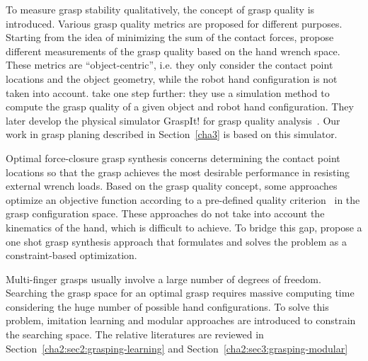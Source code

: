 To measure grasp stability qualitatively, the concept of grasp quality is introduced. Various grasp quality metrics are proposed for different purposes. Starting from the idea of minimizing the sum of the contact forces, \citep{li1988task,kirkpatrick1992quantitative, ferrari1992planning} propose different measurements of the grasp quality based on the hand wrench space.
These metrics are ``object-centric'', i.e. they only consider the contact point locations and the object geometry, while the robot hand configuration is not taken into account. \citet{miller1999examples} take one step further: they use a simulation method to compute the grasp quality of a given object and robot hand configuration. They later develop the physical simulator GraspIt! for grasp quality analysis~\citep{miller2004graspit}. Our work in grasp planing described in Section~\ref{cha3} is based on this simulator.

Optimal force-closure grasp synthesis concerns determining the contact point locations so that the grasp achieves the most desirable performance in resisting external wrench loads.
Based on the grasp quality concept, some approaches optimize an objective function according to a pre-defined quality criterion~\citep{Zhu2003,Zhu04} in the grasp configuration space.
These approaches do not take into account the kinematics of the hand, which is difficult to achieve. To bridge this gap, \citet{S.ElKhoury2012} propose a one shot grasp synthesis approach that formulates and solves the problem as a constraint-based optimization.

Multi-finger grasps usually involve a large number of degrees of freedom.
Searching the grasp space for an optimal grasp requires massive computing time considering the huge number of possible hand configurations. To solve this problem, imitation learning and modular approaches are introduced to constrain the searching space. The relative literatures are reviewed in Section~\ref{cha2:sec2:grasping-learning} and Section~\ref{cha2:sec3:grasping-modular}

